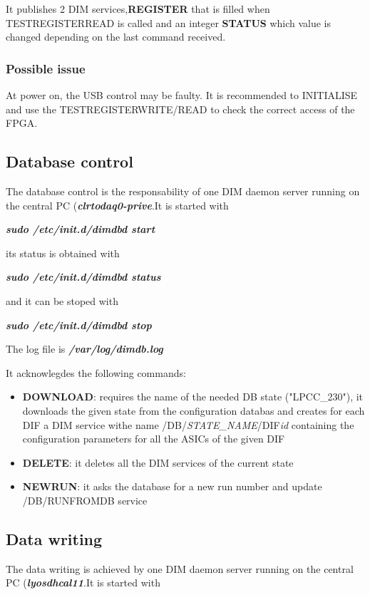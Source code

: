 \documentclass[english]{article}
\begin{document}
It publishes 2 DIM services,{\bf REGISTER} that is filled when TESTREGISTERREAD is called and an integer {\bf STATUS} which value is changed depending on the last command received.
 
\subsubsection{Possible issue}

At power on, the USB control may be faulty. It is recommended to INITIALISE and use the TESTREGISTERWRITE/READ to check the correct access of the FPGA.

\subsection{Database control}

The database control is the responsability of one DIM daemon server running on the central PC ({\bf \sl clrtodaq0-prive}.It is started with

{\sl \bf sudo /etc/init.d/dimdbd start }

its status is obtained with 

{\sl \bf sudo /etc/init.d/dimdbd status }

and it can be stoped with

{\sl \bf sudo /etc/init.d/dimdbd stop }
 
 The log file is {\sl \bf /var/log/dimdb.log }
 
 It acknowlegdes the following commands:
 \begin{itemize}
\item {\bf DOWNLOAD}: requires the name of the needed DB state ("LPCC\_230"), it downloads the given state from the configuration databas and creates for each DIF a DIM service withe name /DB/{\sl STATE\_NAME}/DIF{\sl id} containing the configuration parameters for all the ASICs of the given DIF 
\item {\bf DELETE}: it deletes all the DIM services of the current state
\item {\bf NEWRUN}: it asks the database for a new run number and update /DB/RUNFROMDB service

\end{itemize}

\subsection {Data writing}

The data writing is achieved by one DIM daemon server running on the central PC ({\bf \sl lyosdhcal11}.It is started with
\end{document}
